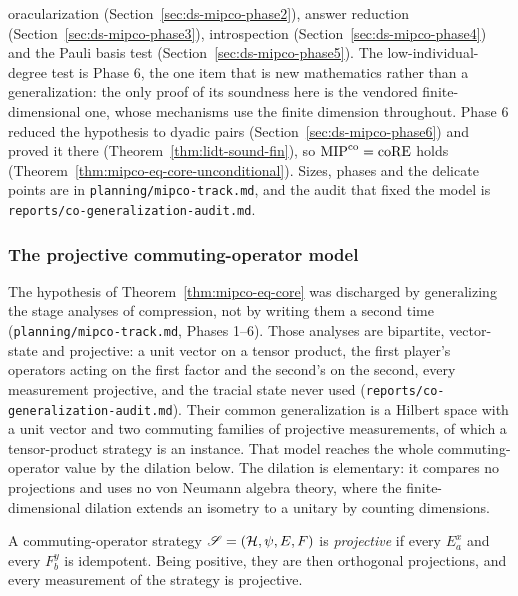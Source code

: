 \begin{remark}
oracularization (Section~\ref{sec:ds-mipco-phase2}), answer reduction
(Section~\ref{sec:ds-mipco-phase3}), introspection (Section~\ref{sec:ds-mipco-phase4}) and the
Pauli basis test (Section~\ref{sec:ds-mipco-phase5}). The low-individual-degree test is Phase 6,
the one item that is new mathematics rather than a generalization: the only proof of its soundness
here is the vendored finite-dimensional one, whose mechanisms use the finite dimension throughout.
Phase 6 reduced the hypothesis to dyadic pairs (Section~\ref{sec:ds-mipco-phase6}) and proved it
there (Theorem~\ref{thm:lidt-sound-fin}), so $\mathrm{MIP}^{\mathrm{co}} = \mathrm{coRE}$ holds
(Theorem~\ref{thm:mipco-eq-core-unconditional}).
Sizes, phases and the delicate points are in \texttt{planning/mipco-track.md}, and the audit that
fixed the model is \texttt{reports/co-generalization-audit.md}.
\end{remark}

\subsubsection{The projective commuting-operator model}
\label{sec:ds-mipco-projective}

The hypothesis of Theorem~\ref{thm:mipco-eq-core} was discharged by generalizing the
stage analyses of compression, not by writing them a second time
(\texttt{planning/mipco-track.md}, Phases 1--6). Those analyses are bipartite, vector-state and
projective: a unit vector on a tensor product, the first player's operators acting on the first
factor and the second's on the second, every measurement projective, and the tracial state never
used (\texttt{reports/co-generalization-audit.md}). Their common generalization is a Hilbert
space with a unit vector and two commuting families of projective measurements, of which a
tensor-product strategy is an instance. That model reaches the whole commuting-operator value by
the dilation below. The dilation is elementary: it compares no projections and uses no von
Neumann algebra theory, where the finite-dimensional dilation extends an isometry to a unitary by
counting dimensions.

\begin{definition}
\label{def:co-projective}
\leanok
A commuting-operator strategy $\mathscr{S} = (\mathcal{H}, \psi, E, F)$ is \emph{projective} if every
$E^x_a$ and every $F^y_b$ is idempotent. Being positive, they are then orthogonal projections,
and every measurement of the strategy is projective.
\end{definition}

